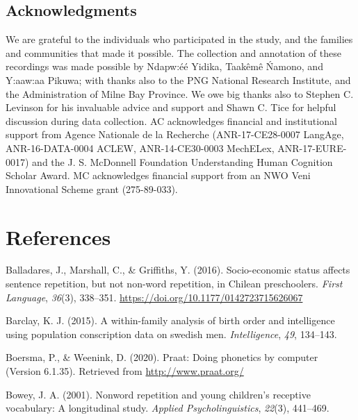 \documentclass[english,,man,floatsintext]{apa6}
\begin{document}
\newpage

\hypertarget{acknowledgments}{%
\subsection{Acknowledgments}\label{acknowledgments}}

We are grateful to the individuals who participated in the study, and the families and communities that made it possible. The collection and annotation of these recordings was made possible by Ndapw:éé Yidika, Taakêmê Ńamono, and Y:aaw:aa Pikuwa; with thanks also to the PNG National Research Institute, and the Administration of Milne Bay Province. We owe big thanks also to Stephen C. Levinson for his invaluable advice and support and Shawn C. Tice for helpful discussion during data collection. AC acknowledges financial and institutional support from Agence Nationale de la Recherche (ANR-17-CE28-0007 LangAge, ANR-16-DATA-0004 ACLEW, ANR-14-CE30-0003 MechELex, ANR-17-EURE-0017) and the J. S. McDonnell Foundation Understanding Human Cognition Scholar Award. MC acknowledges financial support from an NWO Veni Innovational Scheme grant (275-89-033).

\hypertarget{references}{%
\section{References}\label{references}}

\setlength{\parindent}{-0.5in}
\setlength{\leftskip}{0.5in}

\hypertarget{refs}{}
\leavevmode\hypertarget{ref-balladares2016socio}{}%
Balladares, J., Marshall, C., \& Griffiths, Y. (2016). Socio-economic status affects sentence repetition, but not non-word repetition, in Chilean preschoolers. \emph{First Language}, \emph{36}(3), 338--351. \url{https://doi.org/10.1177/0142723715626067}

\leavevmode\hypertarget{ref-barclay2015within}{}%
Barclay, K. J. (2015). A within-family analysis of birth order and intelligence using population conscription data on swedish men. \emph{Intelligence}, \emph{49}, 134--143.

\leavevmode\hypertarget{ref-Praat}{}%
Boersma, P., \& Weenink, D. (2020). Praat: Doing phonetics by computer (Version 6.1.35). Retrieved from \url{http://www.praat.org/}

\leavevmode\hypertarget{ref-bowey2001nonword}{}%
Bowey, J. A. (2001). Nonword repetition and young children's receptive vocabulary: A longitudinal study. \emph{Applied Psycholinguistics}, \emph{22}(3), 441--469.
\end{document}
